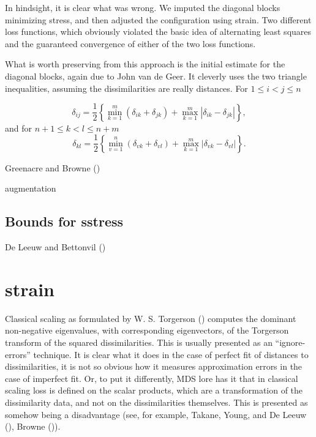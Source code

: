 \documentclass[
  12pt,
  letterpaper,
  DIV=11,
  numbers=noendperiod]{scrreprt}
\theoremstyle{remark}
\begin{document}
In hindsight, it is clear what was wrong. We imputed the diagonal blocks
minimizing stress, and then adjusted the configuration using strain. Two
different loss functions, which obviously violated the basic idea of
alternating least squares and the guaranteed convergence of either of
the two loss functions.

What is worth preserving from this approach is the initial estimate for
the diagonal blocks, again due to John van de Geer. It cleverly uses the
two triangle inequalities, assuming the dissimilarities are really
distances. For \(1\leq i<j\leq n\)

\[
\delta_{ij}=\frac12\left\{\min_{k=1}^m(\delta_{ik}+\delta_{jk}) + \max_{k=1}^m|\delta_{ik}-\delta_{jk}|\right\},
\] and for \(n+1\leq k<l\leq n+m\) \[
\delta_{kl}=\frac12\left\{\min_{v=1}^n(\delta_{vk}+\delta_{vl}) + \max_{k=1}^m|\delta_{vk}-\delta_{vl}|\right\}.
\]

Greenacre and Browne ()

augmentation

\subsection{Bounds for sstress}\label{bounds-for-sstress}

De Leeuw and Bettonvil ()

\section{strain}\label{strain}

Classical scaling as formulated by W. S. Torgerson
() computes the dominant non-negative
eigenvalues, with corresponding eigenvectors, of the Torgerson transform
of the squared dissimilarities. This is usually presented as an
``ignore-errors'' technique. It is clear what it does in the case of
perfect fit of distances to dissimilarities, it is not so obvious how it
measures approximation errors in the case of imperfect fit. Or, to put
it differently, MDS lore has it that in classical scaling loss is
defined on the scalar products, which are a transformation of the
dissimilarity data, and not on the dissimilarities themselves. This is
presented as somehow being a disadvantage (see, for example, Takane,
Young, and De Leeuw (),
Browne ()).
\end{document}
